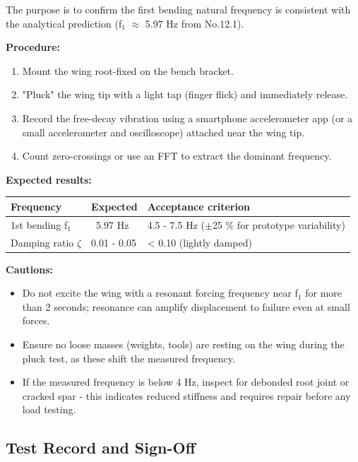 \documentclass[10pt,a4paper]{article}
\begin{document}
The purpose is to confirm the first bending natural frequency is consistent with the analytical prediction (f$_{1}$ ${\approx}$ 5.97 Hz from No.12.1).

\textbf{Procedure:}
\begin{enumerate}[noitemsep,topsep=2pt]
\item Mount the wing root-fixed on the bench bracket.
\item "Pluck" the wing tip with a light tap (finger flick) and immediately release.
\item Record the free-decay vibration using a smartphone accelerometer app (or a small accelerometer and oscilloscope) attached near the wing tip.
\item Count zero-crossings or use an FFT to extract the dominant frequency.
\end{enumerate}

\textbf{Expected results:}

\begin{center}
\begin{tabular}{|l|l|l|}
\hline
Frequency & Expected & Acceptance criterion \\
\hline
1st bending f$_{1}$ & ~5.97 Hz & 4.5 - 7.5 Hz (${\pm}$25 \% for prototype variability) \\
\hline
Damping ratio $\zeta$ & 0.01 - 0.05 & < 0.10 (lightly damped) \\
\hline
\end{tabular}
\end{center}

\textbf{Cautions:}
\begin{itemize}[noitemsep,topsep=2pt]
\item Do not excite the wing with a resonant forcing frequency near f$_{1}$ for more than 2 seconds; resonance can amplify displacement to failure even at small forces.
\item Ensure no loose masses (weights, tools) are resting on the wing during the pluck test, as these shift the measured frequency.
\item If the measured frequency is below 4 Hz, inspect for debonded root joint or cracked spar - this indicates reduced stiffness and requires repair before any load testing.
\end{itemize}

\subsection{Test Record and Sign-Off}
\end{document}
